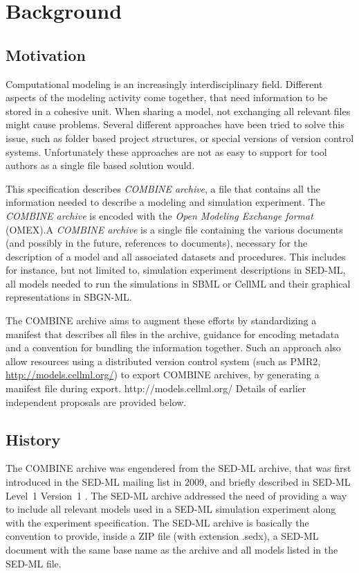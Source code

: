 
\section{Background}  \label{background} 

\subsection{Motivation}

Computational modeling is an increasingly interdisciplinary field. Different aspects of the modeling activity come together, that need information to be stored in a cohesive unit. When sharing a model, not exchanging all relevant files might cause problems. Several different approaches have been tried to solve this issue, such as folder based project structures, or special versions of version control systems. Unfortunately these approaches are not as easy to support for tool authors as a single file based solution would. 

This specification describes \textit{COMBINE archive}, a file that contains all the information needed to describe a modeling and simulation experiment. The \textit{COMBINE archive} is encoded with the \emph{Open Modeling Exchange format} (OMEX).A \textit{COMBINE archive} is a single file containing the various documents (and possibly in the future, references to documents), necessary for the description of a model and all associated datasets and procedures. This includes for instance, but not limited to, simulation experiment descriptions in SED-ML, all models needed to run the simulations in SBML or CellML
and their graphical representations in SBGN-ML. 

The COMBINE archive aims to augment these efforts by standardizing a manifest that describes all files in the archive, guidance for encoding metadata and a convention for bundling the information together. Such an approach also allow resources using a distributed version control system (such as PMR2, \url{http://models.cellml.org/}) to export COMBINE archives, by generating a manifest file during export. 
http://models.cellml.org/
Details of earlier independent proposals are provided below. 

\subsection{History}

The COMBINE archive was engendered from the SED-ML archive, that was first introduced in the SED-ML mailing list in 2009, and briefly described in SED-ML Level~1 Version~1 \citep{Waltemath:2011}. The SED-ML archive addressed the need of providing a way to include all relevant models used in a SED-ML simulation experiment along with the experiment specification. The SED-ML archive is basically the convention to provide, inside a ZIP file (with extension .sedx), a SED-ML document with the same base name as the archive and all models listed in the SED-ML file. 

